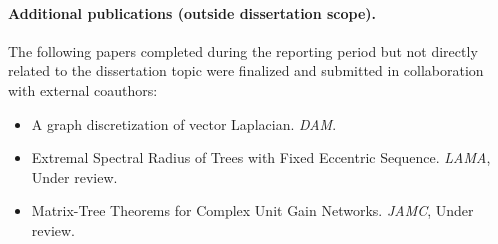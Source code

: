 \documentclass[11pt]{article}
\begin{document}
\paragraph{Additional publications (outside dissertation scope).}
The following papers completed during the reporting period but not directly related to the dissertation topic were finalized and submitted in collaboration with external coauthors:
\begin{itemize}\itemsep0.25em
\item  A graph discretization of vector Laplacian. \textit{DAM}.
\item Extremal Spectral Radius of Trees with Fixed Eccentric Sequence. \textit{LAMA}, Under review. 
\item  Matrix-Tree Theorems for Complex Unit Gain Networks. \textit{JAMC}, Under review.
\end{itemize}



\end{document}
